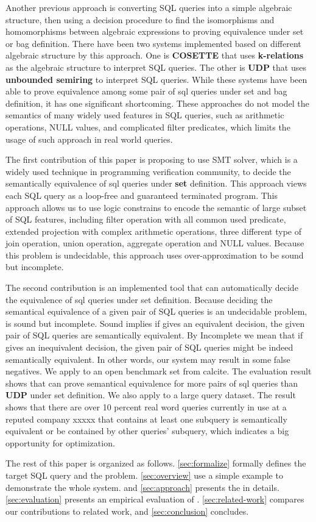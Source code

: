 Another previous approach is converting SQL queries into a simple algebraic
structure, then using a decision procedure to find the isomorphisms and
homomorphisms between algebraic expressions to proving equivalence under set or
bag definition.
There have been two systems implemented based on different algebraic structure
by this approach.
One is \textbf{COSETTE}  that uses \textbf{k-relations} as the
algebraic structure to interpret SQL queries.
The other is \textbf{UDP}  that uses \textbf{unbounded semiring} to
interpret SQL queries.
While these systems have been able to prove equivalence among some pair of sql
queries under set and bag definition, it has one significant shortcoming.
These approaches do not model the semantics of many widely used features in SQL
queries, such as arithmetic operations, NULL values, and complicated filter predicates,
which limits the usage of such approach in real world queries.

The first contribution of this paper is proposing to use SMT solver, which is a
widely used technique in programming verification community, to decide the
semantically equivalence of sql queries under \textbf{set} definition.
This approach views each SQL query as a loop-free and guaranteed terminated
program.
This approach allows us to use logic constrains to encode the semantic of large
subset of SQL features, including filter operation with all common used
predicate, extended projection with complex arithmetic operations, three
different type of join operation, union operation, aggregate operation and NULL
values.
Because this problem is undecidable, this approach uses over-approximation to be
sound but incomplete.

The second contribution is an implemented tool \sys that can automatically
decide the equivalence of sql queries under set definition.
Because deciding the semantical equivalence of a given pair of SQL queries is an
undecidable problem, \sys is sound but incomplete.
Sound implies if \sys gives an equivalent decision, the given pair of SQL
queries are semantically equivalent.
By Incomplete we mean that if \sys gives an inequivalent decision, the given
pair of SQL queries might be indeed semantically equivalent. In other words, our
system \sys may result in some false negatives.
We apply \sys to an open benchmark set from calcite.
The evaluation result shows that \sys can prove semantical equivalence for more
pairs of sql queries than \textbf{UDP} under set definition.
We also apply \sys to a large query dataset.
The result shows that there are over 10 percent real word queries currently in
use at a reputed company xxxxx that contains at least one subquery is
semantically equivalent or be contained by other queries' subquery, which
indicates a big opportunity for optimization.

The rest of this paper is organized as follows.
\autoref{sec:formalize} formally defines the target SQL query and the problem.
\autoref{sec:overview} use a simple example to demonstrate the whole system.
and \autoref{sec:approach} presents the \sys in details.
\autoref{sec:evaluation} presents an empirical evaluation of \sys.
\autoref{sec:related-work} compares our contributions to related work, and
\autoref{sec:conclusion} concludes.
